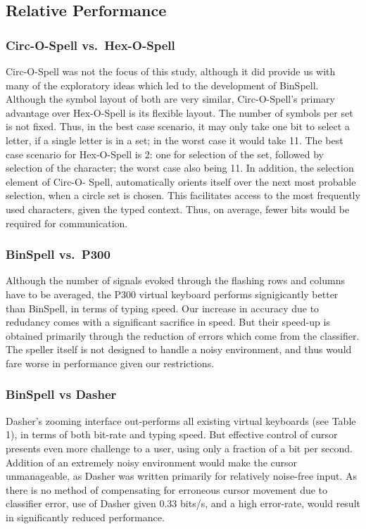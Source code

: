 \documentclass[12pt,titlepage]{article}
\begin{document}
\subsection{Relative Performance}

\subsubsection{Circ-O-Spell vs.\ Hex-O-Spell}

Circ-O-Spell was not the focus of this study, although it did provide us with many of the exploratory ideas which led to the development of BinSpell.  Although the symbol layout of both are very similar, Circ-O-Spell's primary advantage over Hex-O-Spell is its flexible layout.  The number of 
symbols per set is not fixed.  Thus, in the best case scenario, it may only take one bit to select a 
letter, if a single letter is in a set; in the worst case it would take 11.  The best case scenario for Hex-O-Spell is 2: one for selection 
of the set, followed by selection of the character; the worst case also being 11.  In addition, the selection element of Circ-O- 
Spell, automatically orients itself over the next most probable selection, when a circle set is chosen.  This facilitates access to the most frequently used 
characters, given the typed context.  Thus, on average, fewer bits would be required for 
communication.

\subsubsection{BinSpell vs.\ P300}

Although the number of signals evoked through the flashing rows and columns have to be averaged, the P300 virtual keyboard performs signigicantly better than BinSpell, in terms of typing speed.  Our increase in accuracy due to redudancy comes with a significant sacrifice in speed.  But their speed-up is obtained primarily through the reduction of errors which come from the classifier.  The speller itself is not designed to handle a noisy environment, and thus would fare worse in performance given our restrictions.

\subsubsection{BinSpell vs Dasher}

Dasher's zooming interface out-performs all existing virtual keyboards (see Table 1), in terms of both bit-rate and typing speed.  But effective control of cursor presents even more challenge to a user, using only a fraction of a bit per second.  Addition of an extremely 
noisy environment would make the cursor unmanageable, as Dasher was written primarily for relatively noise-free input. As there is no method of compensating for erroneous cursor movement due to classifier error, use of Dasher given $0.33$ bits/s, and a high error-rate, would result in significantly reduced performance.
\end{document}
